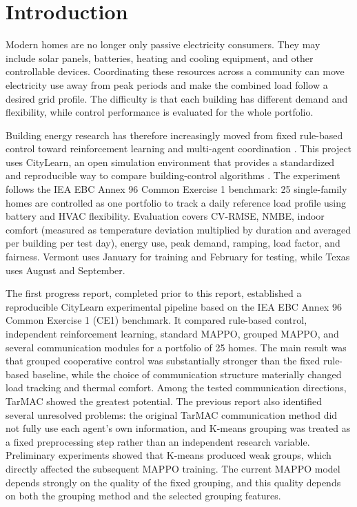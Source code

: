 \chapter{Introduction}\label{ch:intro}

Modern homes are no longer only passive electricity consumers. They may include
solar panels, batteries, heating and cooling equipment, and other controllable
devices. Coordinating these resources across a community can move electricity
use away from peak periods and make the combined load follow a desired grid
profile. The difficulty is that each building has different demand and
flexibility, while control performance is evaluated for the whole portfolio.


Building energy research has therefore increasingly moved from fixed
rule-based control toward reinforcement learning and multi-agent coordination
\cite{charbonnier2025,wilk2024}. This project uses CityLearn, an open simulation
environment that provides a standardized and reproducible way to compare
building-control algorithms \cite{citylearn2020,citylearnv2}. The experiment
follows the IEA EBC Annex 96 Common Exercise 1 benchmark: 25 single-family homes
are controlled as one portfolio to track a daily reference load profile using
battery and HVAC flexibility. Evaluation covers CV-RMSE, NMBE, indoor comfort
(measured as temperature deviation multiplied by duration and averaged per
building per test day), energy use, peak demand, ramping, load factor, and
fairness. Vermont uses
January for training and February for testing, while Texas uses August and
September.


The first progress report, completed prior to this report, established a
reproducible CityLearn experimental pipeline based on the IEA EBC Annex 96
Common Exercise 1 (CE1) benchmark. It compared rule-based control, independent
reinforcement learning, standard MAPPO, grouped MAPPO, and several communication
modules for a portfolio of 25 homes. The main result was that grouped
cooperative control was substantially stronger than the fixed rule-based
baseline, while the choice of communication structure materially changed load
tracking and thermal comfort. Among the tested communication directions,
TarMAC showed the greatest potential. The previous report also identified
several unresolved problems: the original TarMAC communication method did not
fully use each agent's own information, and K-means grouping was treated as a
fixed preprocessing step rather than an independent research variable. Preliminary
experiments showed that K-means produced weak groups, which directly affected
the subsequent MAPPO training. The current MAPPO model depends strongly on the
quality of the fixed grouping, and this quality depends on both the grouping
method and the selected grouping features.


